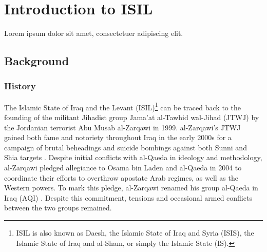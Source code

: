 \documentclass{report}
\newcommand{\shortlipsum}{Lorem ipsum dolor sit amet, consectetuer adipiscing 
elit.}
\begin{document}
\chapter{Introduction to ISIL}





   \shortlipsum
   

    
    
    
    \section{Background}
    
    \subsection{History}
    
    The Islamic State of Iraq and the Levant (ISIL)\footnote{ISIL is also known as Daesh, the Islamic State of Iraq and Syria (ISIS),  the Islamic State of Iraq and al-Sham, or simply the Islamic State (IS).} can be traced back to the founding of the militant Jihadist group Jama'at al-Tawhid wal-Jihad (JTWJ) by the Jordanian terrorist Abu Musab al-Zarqawi in 1999. al-Zarqawi's JTWJ gained both fame and notoriety throughout Iraq in the early 2000s for  a campaign of brutal beheadings and suicide bombings against both Sunni and Shia targets \cite{Zelin2014}. Despite initial conflicts with al-Qaeda in ideology and methodology, al-Zarqawi pledged allegiance to Osama bin Laden and al-Qaeda in 2004 to coordinate  their efforts to overthrow apostate Arab regimes, as well as the Western powers. To mark this pledge, al-Zarqawi renamed his group al-Qaeda in Iraq  (AQI) \cite{Gambill2004}. Despite this commitment, tensions and occasional armed conflicts between the two groups remained.
    
\end{document}
